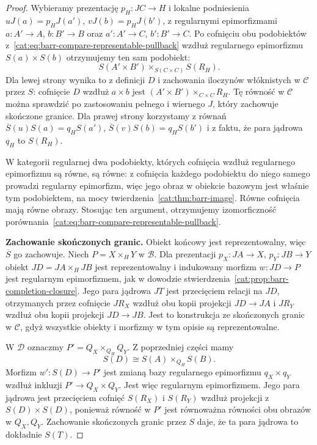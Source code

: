 \begin{proof}
Wybieramy prezentację $p_H:JC\to H$ i lokalne podniesienia $uJ(a)=p_H J(a')$, $vJ(b)=p_HJ(b')$, z regularnymi epimorfizmami $a:A'\to A$, $b:B'\to B$ oraz $a':A'\to C$, $b':B'\to C$. Po cofnięciu obu podobiektów z~\eqref{cat:eq:barr-compare-representable-pullback} wzdłuż regularnego epimorfizmu $S(a)\times S(b)$ otrzymujemy ten sam podobiekt:
\[
 S(A'\times B')\times_{S(C\times C)} S(R_H).
\]
Dla lewej strony wynika to z definicji $D$ i zachowania iloczynów włóknistych w $\mathcal C$ przez $S$: cofnięcie $D$ wzdłuż $a\times b$ jest $(A'\times B')\times_{C\times C}R_H$. Tę równość w $\mathcal C$ można sprawdzić po zastosowaniu pełnego i wiernego $J$, który zachowuje skończone granice. Dla prawej strony korzystamy z równań $\overline S(u)S(a)=q_H S(a')$, $\overline S(v)S(b)=q_H S(b')$ i z faktu, że para jądrowa $q_H$ to $S(R_H)$.

W kategorii regularnej dwa podobiekty, których cofnięcia wzdłuż regularnego epimorfizmu są równe, są równe: z cofnięcia każdego podobiektu do niego samego prowadzi regularny epimorfizm, więc jego obraz w obiekcie bazowym jest właśnie tym podobiektem, na mocy twierdzenia~\ref{cat:thm:barr-image}. Równe cofnięcia mają równe obrazy. Stosując ten argument, otrzymujemy izomorficzność porównania~\eqref{cat:eq:barr-compare-representable-pullback}.

\textbf{Zachowanie skończonych granic.}
Obiekt końcowy jest reprezentowalny, więc $\overline S$ go zachowuje. Niech $P=X\times_H Y$ w $\mathcal B$. Dla prezentacji $p_X:JA\to X$, $p_Y:JB\to Y$ obiekt $JD=JA\times_H JB$ jest reprezentowalny i indukowany morfizm $w:JD\to P$ jest regularnym epimorfizmem, jak w dowodzie stwierdzenia~\ref{cat:prop:barr-completion-closure}. Jego para jądrowa $JT$ jest przecięciem relacji na $JD$, otrzymanych przez cofnięcie $JR_X$ wzdłuż obu kopii projekcji $JD\to JA$ i $JR_Y$ wzdłuż obu kopii projekcji $JD\to JB$. Jest to konstrukcja ze skończonych granic w $\mathcal C$, gdyż wszystkie obiekty i morfizmy w tym opisie są reprezentowalne.

W $\mathcal D$ oznaczmy $P'=Q_X\times_{Q_H}Q_Y$. Z poprzedniej części mamy
\[
 S(D)\cong S(A)\times_{Q_H} S(B).
\]
Morfizm $w':S(D)\to P'$ jest zmianą bazy regularnego epimorfizmu $q_X\times q_Y$ wzdłuż inkluzji $P'\to Q_X\times Q_Y$. Jest więc regularnym epimorfizmem. Jego para jądrowa jest przecięciem cofnięć $S(R_X)$ i $S(R_Y)$ wzdłuż projekcji z $S(D)\times S(D)$, ponieważ równość w $P'$ jest równoważna równości obu obrazów w $Q_X,Q_Y$. Zachowanie skończonych granic przez $S$ daje, że ta para jądrowa to dokładnie $S(T)$.


\end{proof}
